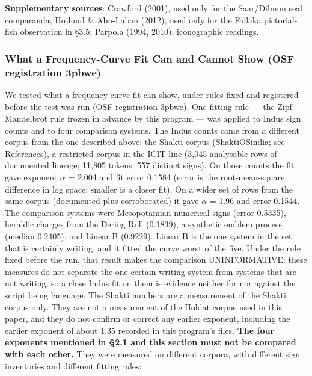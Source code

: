 \documentclass[11pt]{article}
\begin{document}
\textbf{Supplementary sources}: Crawford (2001), used only for the Saar/Dilmun seal comparanda; Hojlund \& Abu-Laban (2012), used only for the Failaka pictorial-fish observation in §3.5; Parpola (1994, 2010), iconographic readings.

\subsubsection{What a Frequency-Curve Fit Can and Cannot Show (OSF registration 3pbwe)}\label{what-a-frequency-curve-fit-can-and-cannot-show-spec-068}

We tested what a frequency-curve fit can show, under rules fixed and registered before the test was run (OSF registration 3pbwe). One fitting rule --- the Zipf--Mandelbrot rule frozen in advance by this program --- was applied to Indus sign counts and to four comparison systems. The Indus counts came from a different corpus from the one described above: the Shakti corpus (ShaktiOSindia; see References), a restricted corpus in the ICIT line (3,045 analysable rows of documented lineage; 11,805 tokens; 557 distinct signs). On those counts the fit gave exponent $\alpha$ = 2.004 and fit error 0.1584 (error is the root-mean-square difference in log space; smaller is a closer fit). On a wider set of rows from the same corpus (documented plus corroborated) it gave $\alpha$ = 1.96 and error 0.1544. The comparison systems were Mesopotamian numerical signs (error 0.5335), heraldic charges from the Dering Roll (0.1839), a synthetic emblem process (median 0.2405), and Linear B (0.9229). Linear B is the one system in the set that is certainly writing, and it fitted the curve worst of the five. Under the rule fixed before the run, that result makes the comparison UNINFORMATIVE: these measures do not separate the one certain writing system from systems that are not writing, so a close Indus fit on them is evidence neither for nor against the script being language. The Shakti numbers are a measurement of the Shakti corpus only. They are not a measurement of the Holdat corpus used in this paper, and they do not confirm or correct any earlier exponent, including the earlier exponent of about 1.35 recorded in this program's files. \textbf{The four exponents mentioned in §2.1 and this section must not be compared with each other.} They were measured on different corpora, with different sign inventories and different fitting rules:
\end{document}

